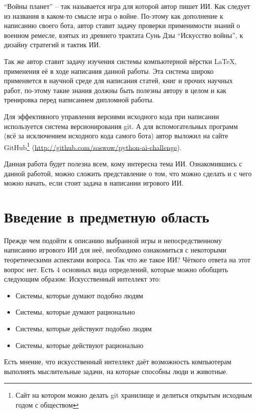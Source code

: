 \documentclass[12pt]{report}
\newenvironment{myItemize}{
	\begin{itemize}
  		\setlength{\itemsep}{1pt}
  		\setlength{\parskip}{0pt}
  		\setlength{\parsep}{0pt}
}{\end{itemize}}
\begin{document}
``Войны планет'' -- так называется игра для которой автор пишет ИИ. Как следует из названия в каком-то смысле игра о войне. По-этому как дополнение к написанию своего бота, автор ставит задачу проверки применимости знаний о военном ремесле, взятых из древнего трактата Сунь Дзы ``Искусство войны'', к дизайну стратегий и тактик ИИ.

Так же автор ставит задачу изучения системы компьютерной вёрстки \LaTeX, применения её в ходе написания данной работы. Эта система широко применяется в научной среде для написания статей, книг и прочих научных работ, по-этому такие знания должны быть полезны автору в целом и как тренировка перед написанием дипломной работы.

Для эффективного управления версиями исходного кода при написании используется система версионирования git. А для вспомогательных программ (всё за исключением исходного кода самого бота) автор выложил на сайте GitHub\footnote{Сайт на котором можно делать git хранилище и делиться открытым исходным годом с обществом} (\url{http://github.com/soswow/python-ai-challenge}).

Данная работа будет полезна всем, кому интересна тема ИИ. Ознакомившись с данной работой, можно сложить представление о том, что можно сделать и с чего можно начать, если стоит задача в написании игрового ИИ.

\chapter{Введение в предметную область}
\thispagestyle{fancy}
Прежде чем подойти к описанию выбранной игры и непосредственному написанию игрового ИИ для неё, необходимо ознакомиться с некоторыми теоретическими аспектами вопроса.
Так что же такое ИИ? Чёткого ответа на этот вопрос нет. Есть 4 основных вида определений, которые можно обобщить следующим образом: \citep{russell1995} Искусственный интеллект это:
\begin{myItemize}
\item Системы, которые думают подобно людям
\item Системы, которые думают рационально
\item Системы, которые действуют подобно людям
\item Системы, которые действуют рационально
\end{myItemize}
Есть мнение, что искусственный интеллект даёт возможность компьютерам выполнять мыслительные задачи, на которые способны люди и животные.\citep{millington2009} 
\end{document}
